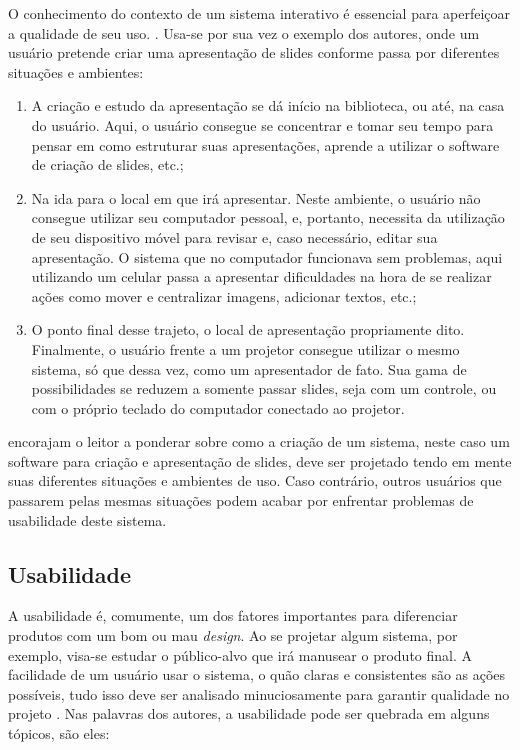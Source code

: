 O conhecimento do contexto de um sistema interativo é essencial para aperfeiçoar a qualidade de seu uso. .
Usa-se por sua vez o exemplo dos autores, onde um usuário pretende criar uma apresentação de slides conforme passa por diferentes situações e ambientes:

\begin{enumerate}
    \item A criação e estudo da apresentação se dá início na biblioteca, ou até, na casa do usuário. Aqui, o usuário consegue se concentrar e tomar seu tempo para pensar em como estruturar suas apresentações, aprende a utilizar o software de criação de slides, etc.;
    \item Na ida para o local em que irá apresentar. Neste ambiente, o usuário não consegue utilizar seu computador pessoal, e, portanto, necessita da utilização de seu dispositivo móvel para revisar e, caso necessário, editar sua apresentação. O sistema que no computador funcionava sem problemas, aqui utilizando um celular passa a apresentar dificuldades na hora de se realizar ações como mover e centralizar imagens, adicionar textos, etc.;
    \item O ponto final desse trajeto, o local de apresentação propriamente dito. Finalmente, o usuário frente a um projetor consegue utilizar o mesmo sistema, só que dessa vez, como um apresentador de fato. Sua gama de possibilidades se reduzem a somente passar slides, seja com um controle, ou com o próprio teclado do computador conectado ao projetor.
\end{enumerate}

 encorajam o leitor a ponderar sobre como a criação de um sistema, neste caso um software para criação e apresentação de slides, deve ser projetado tendo em mente suas diferentes situações e ambientes de uso. Caso contrário, outros usuários que passarem pelas mesmas situações podem acabar por enfrentar problemas de usabilidade deste sistema.

\subsection{Usabilidade}

A usabilidade é, comumente, um dos fatores importantes para diferenciar produtos com um bom ou mau \textit{design}. Ao se projetar algum sistema, por exemplo, visa-se estudar o público-alvo que irá manusear o produto final. A facilidade de um usuário usar o sistema, o quão claras e consistentes são as ações possíveis, tudo isso deve ser analisado minuciosamente para garantir qualidade no projeto \cite{Sharp2019}.
Nas palavras dos autores, a usabilidade pode ser quebrada em alguns tópicos, são eles:

